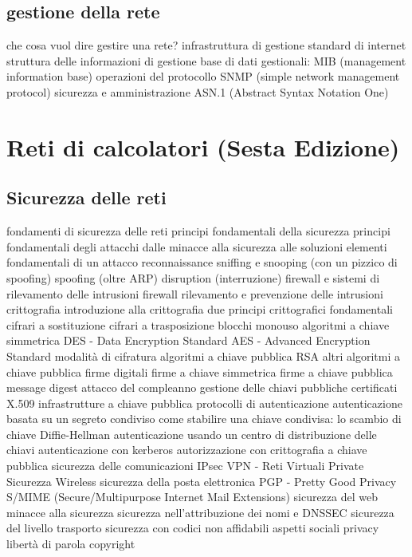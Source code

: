    \section{gestione della rete}
        che cosa vuol dire gestire una rete?
        infrastruttura di gestione standard di internet
            struttura delle informazioni di gestione
            base di dati gestionali: MIB (management information base)
            operazioni del protocollo SNMP (simple network management protocol)
            sicurezza e amministrazione
        ASN.1 (Abstract Syntax Notation One)
\chapter{Reti di calcolatori (Sesta Edizione)}
    \section{Sicurezza delle reti}
        fondamenti di sicurezza delle reti
            principi fondamentali della sicurezza
            principi fondamentali degli attacchi
            dalle minacce alla sicurezza alle soluzioni
        elementi fondamentali di un attacco
            reconnaissance
            sniffing e snooping (con un pizzico di spoofing)
            spoofing (oltre ARP)
            disruption (interruzione)
        firewall e sistemi di rilevamento delle intrusioni
            firewall
            rilevamento e prevenzione delle intrusioni
        crittografia
            introduzione alla crittografia
            due principi crittografici fondamentali
            cifrari a sostituzione
            cifrari a trasposizione
            blocchi monouso
        algoritmi a chiave simmetrica
            DES - Data Encryption Standard
            AES - Advanced Encryption Standard
            modalità di cifratura
        algoritmi a chiave pubblica
            RSA
            altri algoritmi a chiave pubblica
        firme digitali
            firme a chiave simmetrica
            firme a chiave pubblica
            message digest
            attacco del compleanno
        gestione delle chiavi pubbliche
            certificati
            X.509
            infrastrutture a chiave pubblica
        protocolli di autenticazione
            autenticazione basata su un segreto condiviso
            come stabilire una chiave condivisa: lo scambio di chiave Diffie-Hellman
            autenticazione usando un centro di distribuzione delle chiavi
            autenticazione con kerberos
            autorizzazione con crittografia a chiave pubblica
        sicurezza delle comunicazioni
            IPsec
            VPN - Reti Virtuali Private
            Sicurezza Wireless
        sicurezza della posta elettronica
            PGP - Pretty Good Privacy
            S/MIME (Secure/Multipurpose Internet Mail Extensions)
        sicurezza del web
            minacce alla sicurezza
            sicurezza nell'attribuzione dei nomi e DNSSEC
            sicurezza del livello trasporto
            sicurezza con codici non affidabili
        aspetti sociali
            privacy
            libertà di parola
            copyright
